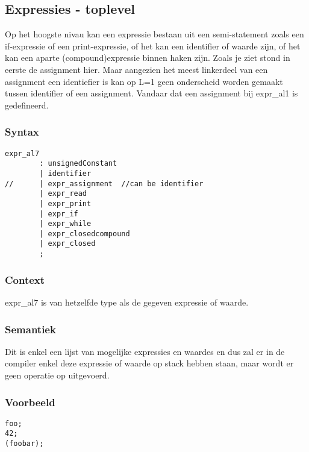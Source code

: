 \documentclass[]{article}
\begin{document}
\subsection{Expressies - toplevel}
Op het hoogste nivau kan een expressie bestaan uit een semi-statement zoals een if-expressie of een print-expressie, of het kan een identifier of waarde zijn, of het kan een aparte (compound)expressie binnen haken zijn.
Zoals je ziet stond in eerste de assignment hier. Maar aangezien het meest linkerdeel van een assignment een identiefier is kan op L=1 geen onderscheid worden gemaakt tussen identifier of een assignment. Vandaar dat een assignment bij expr\_al1 is gedefineerd.
\subsubsection{Syntax}
\begin{lstlisting}[style=ANTLR]
	expr_al7
		: unsignedConstant
		| identifier
//		| expr_assignment  //can be identifier
		| expr_read
		| expr_print
		| expr_if
		| expr_while
		| expr_closedcompound
		| expr_closed
		;
\end{lstlisting}
\subsubsection{Context}
\begin{list}{•}{•}
\item expr\_al7 is van hetzelfde type als de gegeven expressie of waarde.
\end{list}
\subsubsection{Semantiek}
Dit is enkel een lijst van mogelijke expressies en waardes en dus zal er in de compiler enkel deze expressie of waarde op stack hebben staan, maar wordt er geen operatie op uitgevoerd.
\subsubsection{Voorbeeld}
\begin{lstlisting}[style=SELMA]
foo;
42;
(foobar);
\end{lstlisting}

\end{document}
